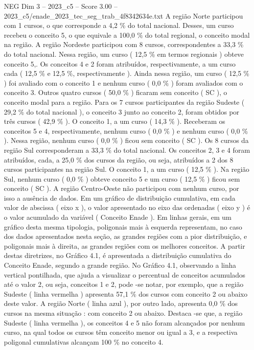 \begin{textsample}{NEG Dim 3 – 2023\_c5 – Score 3.00 – 2023\_c5/enade\_2023\_tec\_seg\_trab\_4f8342634e.txt}
A região Norte participou com 1 cursos, o que corresponde a 4,2 \% do total nacional.
Desses, um curso recebeu o conceito 5, o que equivale a 100,0 \% do total regional, o conceito modal na região.
A região Nordeste participou com 8 cursos, correspondentes a 33,3 \% do total nacional.
Nessa região, um curso ( 12,5 \% em termos regionais ) obteve conceito 5,.
Os conceitos 4 e 2 foram atribuídos, respectivamente, a um curso cada ( 12,5 \% e 12,5 \%, respectivamente ).
Ainda nessa região, um curso ( 12,5 \% ) foi avaliado com o conceito 1 e nenhum curso ( 0,0 \% ) foram avaliados com o conceito 3.
Outros quatro cursos ( 50,0 \% ) ficaram sem conceito ( SC ), o conceito modal para a região.
Para os 7 cursos participantes da região Sudeste ( 29,2 \% do total nacional ), o conceito 3 junto ao conceito 2, foram obtidos por três cursos ( 42,9 \% ).
O conceito 1, a um curso ( 14,3 \% ).
Receberam os conceitos 5 e 4, respectivamente, nenhum curso ( 0,0 \% ) e nenhum curso ( 0,0 \% ).
Nessa região, nenhum curso ( 0,0 \% ) ficou sem conceito ( SC ).
Os 8 cursos da região Sul corresponderam a 33,3 \% do total nacional.
Os conceitos 2, 3 e 4 foram atribuídos, cada, a 25,0 \% dos cursos da região, ou seja, atribuídos a 2 dos 8 cursos participantes na região Sul.
O conceito 1, a um curso ( 12,5 \% ).
Na região Sul, nenhum curso ( 0,0 \% ) obteve conceito 5 e um curso ( 12,5 \% ) ficou sem conceito ( SC ).
A região Centro-Oeste não participou com nenhum curso, por isso a ausência de dados.
Em um gráfico de distribuição cumulativa, em cada valor de abscissa ( eixo x ), o valor apresentado no eixo das ordenadas ( eixo y ) é o valor acumulado da variável ( Conceito Enade ).
Em linhas gerais, em um gráfico desta mesma tipologia, poligonais mais à esquerda representam, no caso dos dados apresentados nesta seção, as grandes regiões com a pior distribuição, e poligonais mais à direita, as grandes regiões com os melhores conceitos.
A partir destas diretrizes, no Gráfico 4.1, é apresentada a distribuição cumulativa do Conceito Enade, segundo a grande região.
No Gráfico 4.1, observando a linha vertical pontilhada, que ajuda a visualizar o percentual de conceitos acumulados até o valor 2, ou seja, conceitos 1 e 2, pode -se notar, por exemplo, que a região Sudeste ( linha vermelha ) apresenta 57,1 \% dos cursos com conceito 2 ou abaixo deste valor.
A região Norte ( linha azul ), por outro lado, apresenta 0,0 \% dos cursos na mesma situação : com conceito 2 ou abaixo.
Destaca -se que, a região Sudeste ( linha vermelha ), os conceitos 4 e 5 não foram alcançados por nenhum curso, na qual todos os cursos têm conceito menor ou igual a 3, e a respectiva poligonal cumulativas alcançam 100 \% no conceito 4.

\end{textsample}
